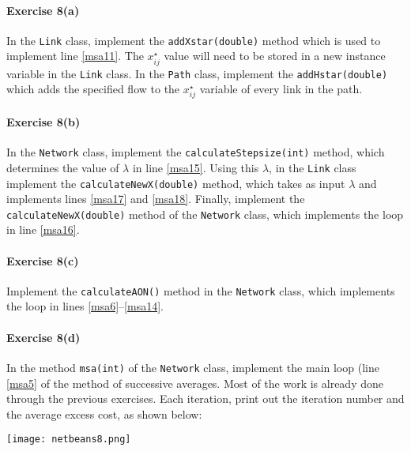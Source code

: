 \documentclass[12pt]{article}
\begin{document}

\paragraph*{Exercise 8(a)} In the \texttt{Link} class, implement the \texttt{addXstar(double)} method which is used to implement line \ref{msa11}. 
The $x^\star_{ij}$ value will need to be stored in a new instance variable in the \texttt{Link} class.
In the \texttt{Path} class, implement the \texttt{addHstar(double)} which adds the specified flow to the $x^\star_{ij}$ variable of every link in the path.



\paragraph*{Exercise 8(b)} In the \texttt{Network} class, implement the \texttt{calculateStepsize(int)} method, which determines the value of $\lambda$ in line \ref{msa15}. Using this $\lambda$, in the \texttt{Link} class implement the \texttt{calculateNewX(double)} method, which takes as input $\lambda$ and implements lines \ref{msa17} and \ref{msa18}. 
Finally, implement the \texttt{calculateNewX(double)} method of the \texttt{Network} class, which implements the loop in line \ref{msa16}. 



\paragraph*{Exercise 8(c)} Implement the \texttt{calculateAON()} method in the \texttt{Network} class, which implements the loop in lines \ref{msa6}--\ref{msa14}. 

\paragraph*{Exercise 8(d)} In the method \texttt{msa(int)} of the \texttt{Network} class, implement the main loop (line \ref{msa5} of the method of successive averages. Most of the work is already done through the previous exercises. Each iteration, print out the iteration number and the average excess cost, as shown below:

\begin{center}
	\texttt{[image: netbeans8.png]}
\end{center}


\end{document}
